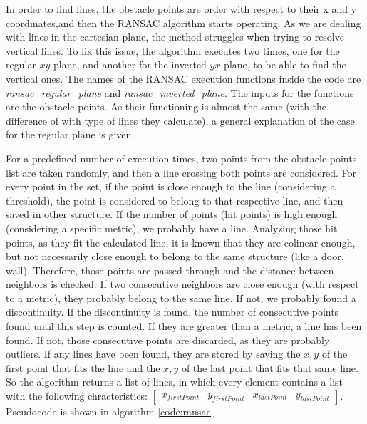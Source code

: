 \documentclass[twoside,conference,a4paper]{IEEEtran}
\begin{document}
In order to find lines, the obstacle points are order with respect to their x and y coordinates,and then the RANSAC algorithm starts operating. As we are dealing with lines in the cartesian plane, the method struggles when trying to resolve vertical lines. To fix this issue, the algorithm executes two times, one for the regular $xy$ plane, and another for the inverted $yx$ plane, to be able to find the vertical ones. The names of the RANSAC execution functions inside the code are \textit{ransac\_regular\_plane} and \textit{ransac\_inverted\_plane}. The inputs for the functions are the obstacle points. As their functioning is almost the same (with the difference of with type of lines they calculate), a general explanation of the case for the regular plane is given.
\par For a predefined number of execution times, two points from the obstacle points list are taken randomly, and then a line crossing both points are considered. For every point in the set, if the point is close enough to the line (considering a threshold), the point is considered to belong to that respective line, and then saved in other structure. If the number of points (hit points) is high enough (considering a specific metric), we probably have a line. Analyzing those hit points, as they fit the calculated line, it is known that they are colinear enough, but not necessarily close enough to belong to the same structure (like a door, wall). Therefore, those points are passed through and the distance between neighbors is checked. If two consecutive neighbors are close enough (with respect to a metric), they probably belong to the same line. If not, we probably found a discontinuity. If the discontinuity is found, the number of consecutive points found until this step is counted. If they are greater than a metric, a line has been found. If not, those consecutive points are discarded, as they are probably outliers. If any lines have been found, they are stored by saving the $x,y$ of the first point that fits the line and the $x, y$ of the last point that fits that same line. So the algorithm returns a list of lines, in which every element contains a list with the following chracteristics: $
\begin{bmatrix}x_{firstPoint} & y_{firstPoint} & x_{lastPoint} & y_{lastPoint}\end{bmatrix}
$. Pseudocode is shown in algorithm \ref{code:ransac}
\end{document}
